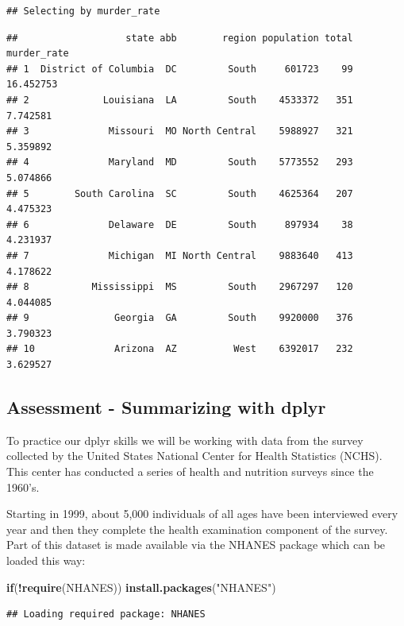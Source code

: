 \documentclass[
]{article}
\newenvironment{Shaded}{\begin{snugshade}}{\end{snugshade}}
\newcommand{\ControlFlowTok}[1]{\textcolor[rgb]{0.13,0.29,0.53}{\textbf{#1}}}
\newcommand{\KeywordTok}[1]{\textcolor[rgb]{0.13,0.29,0.53}{\textbf{#1}}}
\newcommand{\NormalTok}[1]{#1}
\newcommand{\OperatorTok}[1]{\textcolor[rgb]{0.81,0.36,0.00}{\textbf{#1}}}
\newcommand{\StringTok}[1]{\textcolor[rgb]{0.31,0.60,0.02}{#1}}
\begin{document}
\begin{verbatim}
## Selecting by murder_rate
\end{verbatim}

\begin{verbatim}
##                   state abb        region population total murder_rate
## 1  District of Columbia  DC         South     601723    99   16.452753
## 2             Louisiana  LA         South    4533372   351    7.742581
## 3              Missouri  MO North Central    5988927   321    5.359892
## 4              Maryland  MD         South    5773552   293    5.074866
## 5        South Carolina  SC         South    4625364   207    4.475323
## 6              Delaware  DE         South     897934    38    4.231937
## 7              Michigan  MI North Central    9883640   413    4.178622
## 8           Mississippi  MS         South    2967297   120    4.044085
## 9               Georgia  GA         South    9920000   376    3.790323
## 10              Arizona  AZ          West    6392017   232    3.629527
\end{verbatim}

\hypertarget{assessment---summarizing-with-dplyr}{%
\subsection{Assessment - Summarizing with
dplyr}\label{assessment---summarizing-with-dplyr}}

To practice our dplyr skills we will be working with data from the
survey collected by the United States National Center for Health
Statistics (NCHS). This center has conducted a series of health and
nutrition surveys since the 1960's.

Starting in 1999, about 5,000 individuals of all ages have been
interviewed every year and then they complete the health examination
component of the survey. Part of this dataset is made available via the
NHANES package which can be loaded this way:

\begin{Shaded}
\begin{Highlighting}[]
\ControlFlowTok{if}\NormalTok{(}\OperatorTok{!}\KeywordTok{require}\NormalTok{(NHANES)) }\KeywordTok{install.packages}\NormalTok{(}\StringTok{"NHANES"}\NormalTok{)}
\end{Highlighting}
\end{Shaded}

\begin{verbatim}
## Loading required package: NHANES
\end{verbatim}
\end{document}
